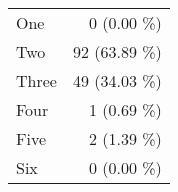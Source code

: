 \begin{tabular}{ l  r }
One & 0 (0.00 \%)\\
Two & 92 (63.89 \%)\\
Three & 49 (34.03 \%)\\
Four & 1 (0.69 \%)\\
Five & 2 (1.39 \%)\\
Six & 0 (0.00 \%)\\
\end{tabular}